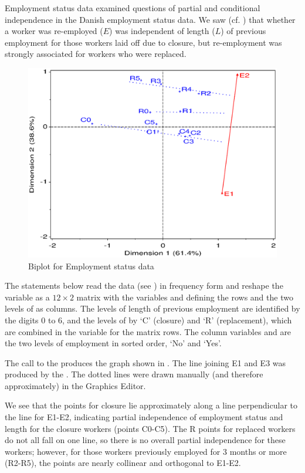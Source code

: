 \begin{Example}[employ2]{Employment status data}
 examined questions of partial and conditional independence
in the Danish employment status data.
We saw (cf. ) that whether a worker was re-employed ($E$)
was independent of length ($L$) of previous employment for those workers
laid off due to closure, but re-employment was strongly associated
for workers who were replaced.

\begin{figure}[htb]
  \centering
  \includegraphics[scale=.8]{ch5/fig/employe}
  \caption[Biplot for Employment status data]{Biplot for Employment status data}  \label{fig:employe}
\end{figure}

The statements below read the data (see ) in frequency form
and reshape the  variable as a $12 \times 2$ matrix
with the variables  and  defining the rows
and the two levels of  as columns.
The levels of length of previous employment are identified by the
digits 0 to 6, and the levels of  by `C' (closure) and
`R' (replacement),
which are combined in the  variable for the matrix rows.
The column variables  and  are the two levels
of employment in sorted order, `No' and `Yes'.

The call to the  produces the graph shown in .
The line joining E1 and E3 was produced by the .
The dotted lines were drawn manually (and therefore approximately) in the Graphics Editor.

We see that the points for closure lie approximately along a line perpendicular to the line for E1-E2, indicating partial independence
of employment status
and length for the closure workers (points C0-C5).
The R points for replaced workers do not all fall on one line,
so there is no overall partial independence for these workers;
however, for those workers previously employed for 3 months or more
(R2-R5),  the points are nearly collinear and orthogonal to E1-E2.
\end{Example}
